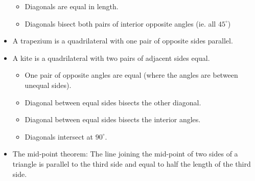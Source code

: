 \begin{itemize}[noitemsep]
\begin{itemize}
\item Diagonals are equal in length.
\item Diagonals bisect both pairs of interior opposite angles (ie. all $45^\circ$)
\end{itemize}
\item A trapezium is a quadrilateral with one pair of opposite sides parallel.
\item A kite is a quadrilateral with two pairs of adjacent sides equal.
\begin{itemize}
\item One pair of opposite angles are equal (where the angles are between unequal sides).
\item Diagonal between equal sides bisects the other diagonal.
\item Diagonal between equal sides bisects the interior angles.
\item Diagonals intersect at $90^\circ$.
\end{itemize}
\item The mid-point theorem: The line joining the mid-point of two sides of a triangle is parallel to the third side and equal to half the length of the third side.
\end{itemize}

